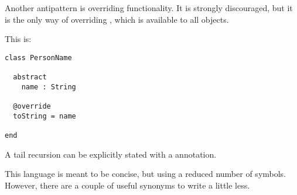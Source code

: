 Another antipattern is overriding functionality.
It is strongly discouraged, but it is the only way of overriding , which is available to all objects.

This is:
\begin{lstlisting}[label={lst:exampleToString}]
class PersonName

  abstract
    name : String

  @override
  toString = name

end
\end{lstlisting}

A tail recursion can be explicitly stated with a \sodatailrec annotation.

This language is meant to be concise, but using a reduced number of symbols.
However, there are a couple of useful synonyms to write a little less.

